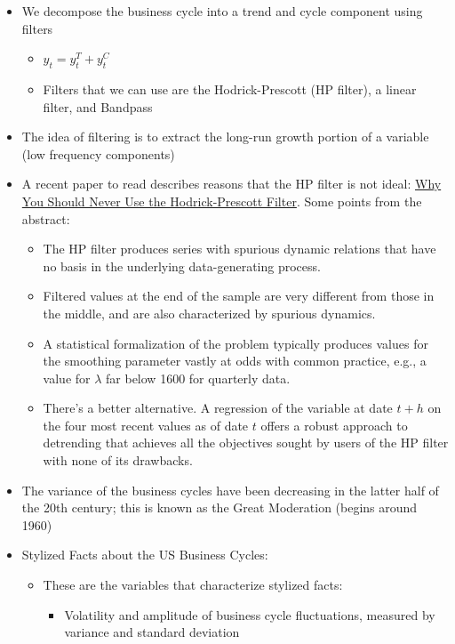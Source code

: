 \documentclass[12pt]{article}
\begin{document}
\begin{itemize}
    \item We decompose the business cycle into a trend and cycle component using filters
    \begin{itemize}
        \item $y_t = y_t^T + y_t^C$
        \item Filters that we can use are the Hodrick-Prescott (HP filter), a linear filter, and Bandpass
    \end{itemize}
    \item The idea of filtering is to extract the long-run growth portion of a variable (low frequency components)
    \item A recent paper to read describes reasons that the HP filter is not ideal: \href{https://www.nber.org/system/files/working_papers/w23429/w23429.pdf}{Why You Should Never Use the Hodrick-Prescott Filter}. Some points from the abstract:
    \begin{itemize}
        \item The HP filter produces series with spurious dynamic relations that have no basis in the underlying data-generating process.
        \item Filtered values at the end of the sample are very different from those in the middle, and are also characterized by spurious dynamics.
        \item A statistical formalization of the problem typically produces values for the smoothing parameter vastly at odds with common practice, e.g., a value for $\lambda$ far below 1600 for quarterly data.
        \item There's a better alternative. A regression of the variable at date $t+h$ on the four most recent values as of date $t$ offers a robust approach to detrending that achieves all the objectives sought by users of the HP filter with none of its drawbacks.
    \end{itemize}
    \item The variance of the business cycles have been decreasing in the latter half of the 20th century; this is known as the Great Moderation (begins around 1960)
    \item Stylized Facts about the US Business Cycles:
    \begin{itemize}
        \item These are the variables that characterize stylized facts:
        \begin{itemize}
            \item Volatility and amplitude of business cycle fluctuations, measured by variance and standard deviation

\end{itemize}
\end{itemize}
\end{itemize}
\end{document}
